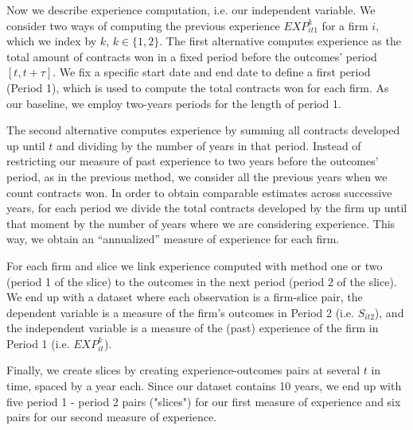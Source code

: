 Now we describe experience computation, i.e. our independent variable. We consider two ways of computing the previous experience $EXP^k_{it1}$ for a firm $i$, which we index by $k$, $k\in \{1,2\}$. The first alternative computes experience as the total amount of contracts won in a fixed period before the outcomes' period $[t,t+\tau]$. We fix a specific start date and end date to define a first period (Period 1), which is used to compute the total contracts won for each firm. As our baseline, we employ two-years periods for the length of period 1.

The second alternative computes experience by summing all contracts developed up until $t$ and dividing by the number of years in that period. Instead of restricting our measure of past experience to two years before the outcomes' period, as in the previous method, we consider all the previous years when we count contracts won. In order to obtain comparable estimates across successive years, for each period we divide the total contracts developed by the firm up until that moment by the number of years where we are considering experience. This way, we obtain an “annualized” measure of experience for each firm.

For each firm and slice we link experience computed with method one or two (period 1 of the slice) to the outcomes in the next period (period 2 of the slice). We end up with a dataset where each observation is a firm-slice pair, the dependent variable is a measure of the firm’s outcomes in Period 2 (i.e. $S_{it2}$), and the independent variable is a measure of the (past) experience of the firm in Period 1 (i.e. $EXP^k_{it}$).

Finally, we create slices by creating experience-outcomes pairs at several $t$ in time, spaced by a year each. Since our dataset contains 10 years, we end up with five period 1 - period 2 pairs ("slices") for our first measure of experience and six pairs for our second measure of experience.


